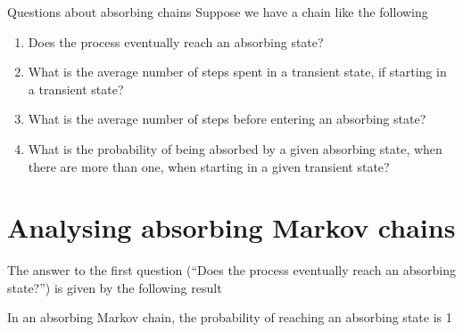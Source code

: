 \documentclass[aspectratio=169]{beamer}\usepackage[]{graphicx}\usepackage[]{xcolor}
\begin{document}
\begin{frame}{Questions about absorbing chains}
Suppose we have a chain like the following
\begin{center}
\end{center}
\vfill
\begin{enumerate}
\item Does the process eventually reach an absorbing state?
\item What is the average number of steps spent in a transient state, if starting in a transient state?
\item What is the average number of steps before entering an absorbing state?
\item What is the probability of being absorbed by a given absorbing state, when there are more than one, when starting in a given transient state?
\end{enumerate}
\end{frame}

\section{Analysing absorbing Markov chains}

\begin{frame}
The answer to the first question (``Does the process eventually reach an absorbing state?'') is given by the following result
\vfill
\begin{theorem}
In an absorbing Markov chain, the probability of reaching an absorbing state is 1
\end{theorem}
\end{frame}
\end{document}
